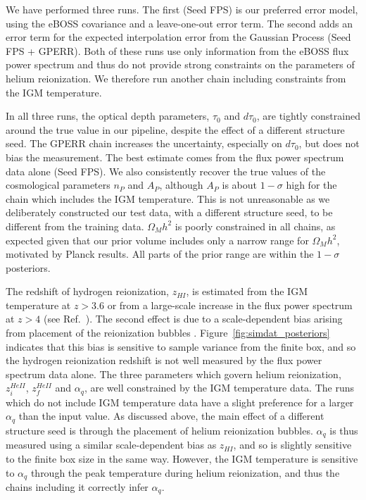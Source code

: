 We have performed three runs.
The first (Seed FPS) is our preferred error model, using the eBOSS covariance and a leave-one-out error term.
The second adds an error term for the expected interpolation error from the Gaussian Process (Seed FPS + GPERR).
Both of these runs use only information from the eBOSS flux power spectrum and thus do not provide strong constraints on the parameters of helium reionization.
We therefore run another chain including constraints from the IGM temperature.

In all three runs, the optical depth parameters, $\tau_0$ and $d\tau_0$, are tightly constrained around the true value in our pipeline, despite the effect of a different structure seed. The GPERR chain increases the uncertainty, especially on $d\tau_0$, but does not bias the measurement.
The best estimate comes from the flux power spectrum data alone (Seed FPS).
We also consistently recover the true values of the cosmological parameters $n_P$ and $A_P$, although $A_P$ is about $1-\sigma$ high for the chain which includes the IGM temperature.
This is not unreasonable as we deliberately constructed our test data, with a different structure seed, to be different from the training data.
$\Omega_M h^2$ is poorly constrained in all chains, as expected given that our prior volume includes only a narrow range for $\Omega_M h^2$, motivated by Planck results.
All parts of the prior range are within the $1-\sigma$ posteriors.

The redshift of hydrogen reionization, $z_{HI}$, is estimated from the IGM temperature at $z > 3.6$ or from a large-scale increase in the flux power spectrum at $z > 4$ (see Ref.~\cite{2023simsuite}).
The second effect is due to a scale-dependent bias arising from placement of the reionization bubbles \cite{Montero:2019}.
Figure~\ref{fig:simdat_posteriors} indicates that this bias is sensitive to sample variance from the finite box, and so the hydrogen reionization redshift is not well measured by the flux power spectrum data alone.
The three parameters which govern helium reionization, $z_i^{HeII}$, $z_f^{HeII}$ and $\alpha_q$, are well constrained by the IGM temperature data.
The runs which do not include IGM temperature data have a slight preference for a larger $\alpha_q$ than the input value.
As discussed above, the main effect of a different structure seed is through the placement of helium reionization bubbles.
$\alpha_q$ is thus measured using a similar scale-dependent bias as $z_{HI}$, and so is slightly sensitive to the finite box size in the same way.
However, the IGM temperature is sensitive to $\alpha_q$ through the peak temperature during helium reionization, and thus the chains including it correctly infer $\alpha_q$.

